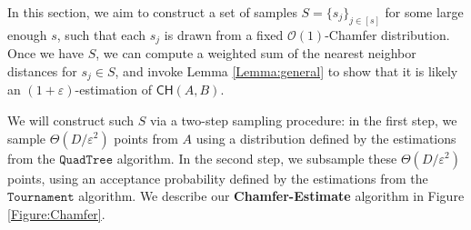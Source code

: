 \documentclass[11pt]{article}
\newcommand{\eps}{\varepsilon}
\theoremstyle{plain}
\newcommand{\OO}{\mathcal{O}}
\newcommand{\Tournament}{\texttt{Tournament}}
\newcommand{\QuadTree}{\texttt{QuadTree}} \usepackage{microtype}
\begin{document}
In this section, we aim to construct a set of samples $S = \{s_j\}_{j \in [s]}$ for some large enough $s$, such that
each $s_j$ is drawn from a fixed $\OO(1)$-Chamfer distribution. Once we have $S$, we can compute a weighted sum of the nearest neighbor distances for $s_j \in S$, and invoke Lemma \ref{Lemma:general} to show that it is likely an $(1+\eps)$-estimation of $\mathsf{CH}(A, B)$.

We will construct such $S$ via a two-step sampling procedure: in the first step, we sample $\Theta({{D}}/\eps^2)$ points from $A$ using a distribution defined by the estimations from the $\QuadTree$ algorithm. In the second step, we subsample these $\Theta({{D}}/\eps^2)$ points, using an acceptance probability defined by the estimations from the $\Tournament$ algorithm. We describe our \textbf{Chamfer-Estimate} algorithm in Figure \ref{Figure:Chamfer}.
\end{document}
